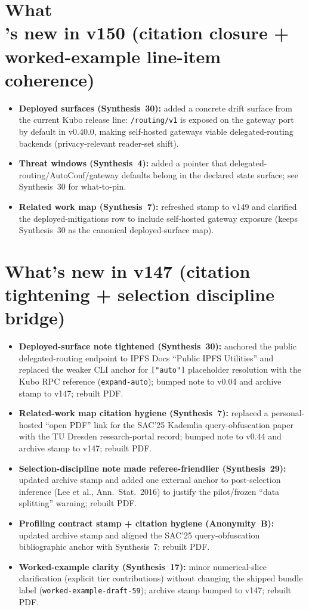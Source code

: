 \documentclass[11pt]{article}
\begin{document}
\section{What\\'s new in v150 (citation closure + worked-example line-item coherence)}
\begin{itemize}[leftmargin=*]
\item \textbf{Deployed surfaces (Synthesis~30):} added a concrete drift surface from the current Kubo release line: \texttt{/routing/v1} is exposed on the gateway port by default in v0.40.0, making self-hosted gateways viable delegated-routing backends (privacy-relevant reader-set shift).
\item \textbf{Threat windows (Synthesis~4):} added a pointer that delegated-routing/AutoConf/gateway defaults belong in the declared state surface; see Synthesis~30 for what-to-pin.
\item \textbf{Related work map (Synthesis~7):} refreshed stamp to v149 and clarified the deployed-mitigations row to include self-hosted gateway exposure (keeps Synthesis~30 as the canonical deployed-surface map).
\end{itemize}

\section{What's new in v147 (citation tightening + selection discipline bridge)}
\begin{itemize}[leftmargin=*]
\item \textbf{Deployed-surface note tightened (Synthesis~30):} anchored the public delegated-routing endpoint to IPFS Docs ``Public IPFS Utilities'' and replaced the weaker CLI anchor for \texttt{["auto"]} placeholder resolution with the Kubo RPC reference (\texttt{expand-auto}); bumped note to v0.04 and archive stamp to v147; rebuilt PDF.
\item \textbf{Related-work map citation hygiene (Synthesis~7):} replaced a personal-hosted ``open PDF'' link for the SAC'25 Kademlia query-obfuscation paper with the TU Dresden research-portal record; bumped note to v0.44 and archive stamp to v147; rebuilt PDF.
\item \textbf{Selection-discipline note made referee-friendlier (Synthesis~29):} updated archive stamp and added one external anchor to post-selection inference (Lee et al., Ann.\ Stat.\ 2016) to justify the pilot/frozen ``data splitting'' warning; rebuilt PDF.
\item \textbf{Profiling contract stamp + citation hygiene (Anonymity~B):} updated archive stamp and aligned the SAC'25 query-obfuscation bibliographic anchor with Synthesis~7; rebuilt PDF.
\item \textbf{Worked-example clarity (Synthesis~17):} minor numerical-slice clarification (explicit tier contributions) without changing the shipped bundle label (\texttt{worked-example-draft-59}); archive stamp bumped to v147; rebuilt PDF.
\end{itemize}
\end{document}
